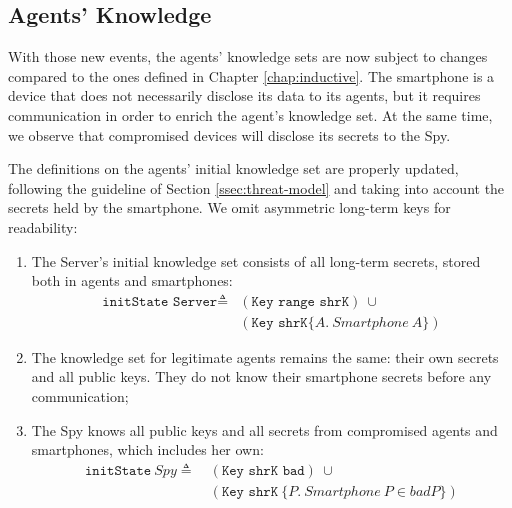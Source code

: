 \subsection{Agents' Knowledge}
\label{ssec:agents-knowledge-smartphone}
With those new events, the agents' knowledge sets are now subject to changes compared to the ones defined in Chapter \ref{chap:inductive}. The smartphone is a device that does not necessarily disclose its data to its agents, but it requires communication in order to enrich the agent's knowledge set. At the same time, we observe that compromised devices will disclose its secrets to the Spy.

The definitions on the agents' initial knowledge set are properly updated, following the guideline of Section \ref{ssec:threat-model} and taking into account the secrets held by the smartphone. We omit asymmetric long-term keys for readability:
%
\begin{enumerate}
  \item The Server's initial knowledge set consists of all long-term secrets, stored both in agents and smartphones:
  \begin{equation*}
    \begin{split}
      \texttt{initState Server} \triangleq
      & (\texttt{Key range shrK}) \ \cup \\
      & (\texttt{Key shrK}\{A.\ Smartphone\ A\})
    \end{split}
  \end{equation*}
  \item The knowledge set for legitimate agents remains the same: their own secrets and all public keys. They do not know their smartphone secrets before any communication;

  \item The Spy knows all public keys and all secrets from compromised agents and smartphones, which includes her own:
  \begin{equation*}
    \begin{split}
      \texttt{initState}\ Spy \triangleq\
      & (\texttt{Key shrK bad}) \ \cup \\
      & (\texttt{Key shrK}\ \{P.\ Smart phone\ P \in badP\})
    \end{split}
  \end{equation*}
\end{enumerate}

